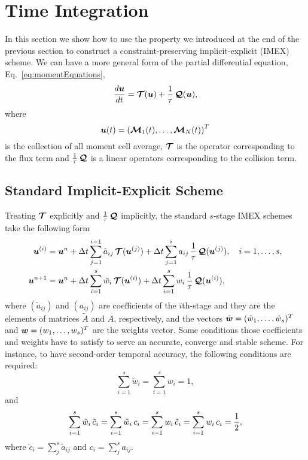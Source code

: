 \section{Time Integration}
In this section we show how to use the property we introduced at the end of the previous section to construct a constraint-preserving implicit-explicit (IMEX) scheme.
We can have a more general form of the partial differential equation, Eq.~\eqref{eq:momentEquations},
\begin{equation}
  \dfrac{d \boldsymbol{u}}{d t} = \boldsymbol{\mathcal{T}}(\boldsymbol{u}) + \frac{1}{\tau}\,\boldsymbol{\mathcal{Q}}(\boldsymbol{u}),
\end{equation}
where
\begin{equation}
\boldsymbol{u}(t) = \left( \boldsymbol{\mathcal{M}}_{1}(t),\ldots,\boldsymbol{\mathcal{M}}_{N}(t)\right) ^{T}
\end{equation}
is the collection of all moment cell average, $\boldsymbol{\mathcal{T}}$ is the operator corresponding to the flux term and $\frac{1}{\tau}\,\boldsymbol{\mathcal{Q}}$ is a linear operators corresponding to the collision term.


\subsection{Standard Implicit-Explicit Scheme}
Treating $\boldsymbol{\mathcal{T}}$ explicitly and $\frac{1}{\tau}\,\boldsymbol{\mathcal{Q}}$ implicitly, the standard $s$-stage IMEX schemes take the following form 
\begin{align}
  \boldsymbol{u}^{(i)}
  &=\boldsymbol{u}^{n}
  +\Delta t\sum_{j=1}^{i-1}\tilde{a}_{ij}\,\boldsymbol{\mathcal{T}}(\boldsymbol{u}^{(j)})
  +\Delta t\sum_{j=1}^{i}a_{ij}\,\frac{1}{\tau}\,\boldsymbol{\mathcal{Q}}(\boldsymbol{u}^{(j)}),
  \quad i=1,\ldots,s, \label{imexStages} \\
  \boldsymbol{u}^{n+1}
  &=\boldsymbol{u}^{n}
  +\Delta t\sum_{i=1}^{s}\tilde{w}_{i}\,\boldsymbol{\mathcal{T}}(\boldsymbol{u}^{(i)})
  +\Delta t\sum_{i=1}^{s}w_{i}\,\frac{1}{\tau}\,\boldsymbol{\mathcal{Q}}(\boldsymbol{u}^{(i)}), \label{imexIntermediate} 
\end{align}
where  $(\tilde{a}_{ij})$ and $(a_{ij})$ are coefficients of the $i$th-stage and they are the elements of matrices $\tilde{A}$ and $A$, respectively, and the vectors $\tilde{\boldsymbol{w}}=(\tilde{w}_{1},\ldots,\tilde{w}_{s})^{T}$ and $\boldsymbol{w}=(w_{1},\ldots,w_{s})^{T}$ are the weights vector.
Some conditions those coefficients and weights have to satisfy to serve an accurate, converge and stable scheme.
For instance, to have second-order temporal accuracy, the following conditions are required:
\begin{equation}
  \sum_{i=1}^{s}\tilde{w}_{i}=\sum_{i=1}^{s}w_{i}=1,
  \label{orderConditions1}
\end{equation}
and
\begin{equation}
  \sum_{i=1}^{s}\tilde{w}_{i}\,\tilde{c}_{i}
  =\sum_{i=1}^{s}\tilde{w}_{i}\,c_{i}
  =\sum_{i=1}^{s}w_{i}\,\tilde{c}_{i}
  =\sum_{i=1}^{s}w_{i}\,c_{i}=\frac{1}{2}, 
  \label{orderConditions2}
\end{equation}
where $\tilde{c}_{i} = \sum_{j}^{s}\tilde{a}_{ij}$ and $c_{i}=\sum_{j}^{s}a_{ij}$.

